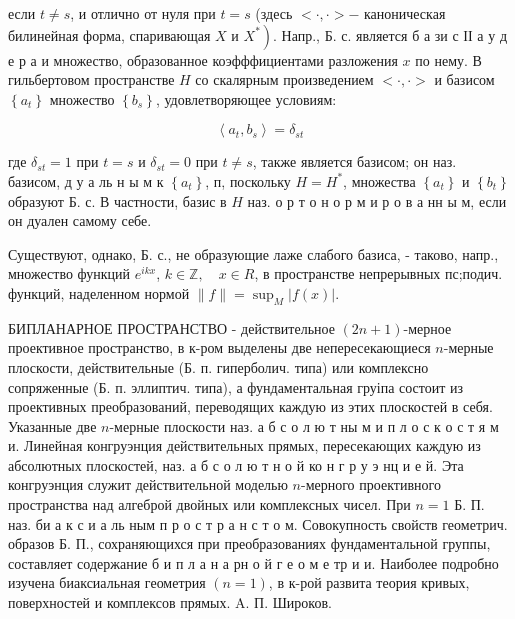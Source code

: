 \documentclass[10pt]{article}
\begin{document}
если $t \neq s$, и отлично от нуля при $t=s$ (здесь $<\cdot, \cdot>-$ каноническая билинейная форма, спаривающая $X$ и $\left.X^{*}\right)$. Напр., Б. с. является б а зи с ІІ а у д е р а и множество, образованное коэфффициентами разложения $x$ по нему. В гильбертовом пространстве $H$ со скалярным произведением $<\cdot, \cdot>$ и базисом $\left\{a_{t}\right\}$ множество $\left\{b_{s}\right\}$, удовлетворяющее условиям:



\[

\left\langle a_{t}, b_{s}\right\rangle=\delta_{s t}

\]



где $\delta_{s t}=1$ при $t=s$ и $\delta_{s t}=0$ при $t \neq s$, также является базисом; он наз. базисом, д у а ль н ы м к $\left\{a_{t}\right\}$, п, поскольку $H=H^{*}$, множества $\left\{a_{t}\right\}$ и $\left\{b_{t}\right\}$ образуют Б. с. В частности, базис в $H$ наз. о р т о н о р м и р о в а нн ы м, если он дуален самому себе.



Существуют, однако, Б. с., не образующие лаже слабого базиса, - таково, напр., множество функций $e^{i k x}$, $k \in \mathbb{Z}, \quad x \in R$, в пространстве непрерывных пс;подич. функций, наделенном нормой $\|f\|=\sup _{M}|f(x)|$.



БИПЛАНАРНОЕ ПРОСТРАНСТВО - действительное $(2 n+1)$-мерное проективное пространство, в к-ром выделены две непересекающиеся $n$-мерные плоскости, действительные (Б. п. гиперболич. типа) или комплексно сопряженные (Б. п. эллиптич. типа), а фундаментальная груіпа состоит из проективных преобразований, переводящих каждую из этих плоскостей в себя. Указанные две $n$-мерные плоскости наз. а б с о л ю т ны м и п л о с к о с т я м и. Линейная конгруэнция действительных прямых, пересекающих каждую из абсолютных плоскостей, наз. а б с о л ю т н о й ко н г р у э нц и е й. Эта конгруэнция служит действительной моделью $n$-мерного проективного пространства над алгеброй двойных или комплексных чисел. При $n=1$ Б. П. наз. би а к с и а ль ным п р о с т р а н с т о м. Совокупность свойств геометрич. образов Б. П., сохраняющихся при преобразованиях фундаментальной группы, составляет содержание б и п л а н а рн о й г е о м е тр и и. Наиболее подробно изучена биаксиальная геометрия $(n=1)$, в к-рой развита теория кривых, поверхностей и комплексов прямых. A. П. Широков.
\end{document}

